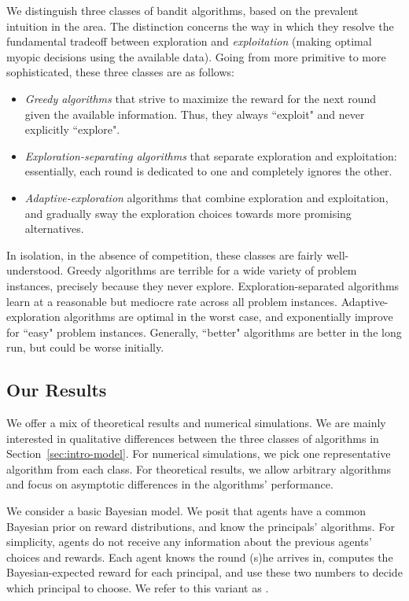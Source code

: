 We distinguish three classes of bandit algorithms, based on
the prevalent intuition in the area. The distinction concerns the way in which they resolve the fundamental tradeoff between  exploration and \emph{exploitation} (making optimal myopic decisions using the available data). Going from more primitive to more sophisticated, these three classes are as follows:

\begin{itemize}
\item \emph{Greedy algorithms} that strive to maximize the reward for the next round given the available information. Thus, they always ``exploit" and never explicitly ``explore".


\item \emph{Exploration-separating algorithms}
 that separate exploration and exploitation: essentially, each round is dedicated to one and completely ignores the other.

\item \emph{Adaptive-exploration} algorithms that combine exploration and exploitation, and gradually sway the exploration choices towards more promising alternatives.
\end{itemize}

In isolation, \ie in the absence of competition, these classes are fairly well-understood. Greedy algorithms are terrible for a wide variety of problem instances, precisely because they never explore. Exploration-separated algorithms learn at a reasonable but mediocre rate across all problem instances. Adaptive-exploration algorithms are optimal in the worst case, and exponentially improve for ``easy" problem instances. Generally,  ``better" algorithms are better in the long run, but could be worse initially.



\subsection{Our Results}
\label{sec:intro-results}

We offer a mix of theoretical results and numerical simulations. We are mainly interested in qualitative differences between the three classes of algorithms in Section~\ref{sec:intro-model}. For numerical simulations, we pick one representative algorithm from each class. For theoretical results, we allow arbitrary algorithms and focus on asymptotic differences in the algorithms' performance.

We consider a basic Bayesian model. We posit that agents have a common Bayesian prior on reward distributions, and know the principals' algorithms. For simplicity, agents do not receive any information about the previous agents' choices and rewards. Each agent knows the round (s)he arrives in, computes the Bayesian-expected reward for each principal, and use these two numbers to decide which principal to choose. We refer to this variant as \emTheoryModel.

